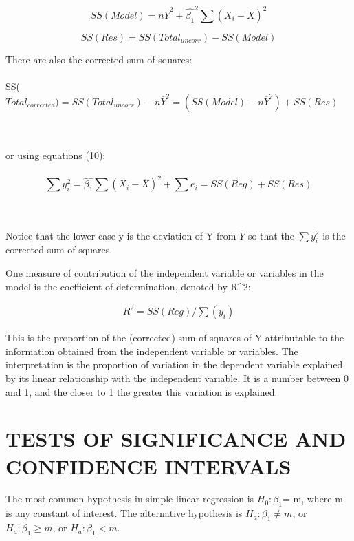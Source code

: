 \documentclass[letterpaper,11pt]{article}
\begin{document}
	\begin{equation}	
	SS(Model)= n \overline{Y}^2 + \hat{\beta_{1}}^2 \sum(X_{i} - \overline{X})^2
	\end{equation}
		
	\begin{equation}		
	SS(Res)= SS(Total_{uncorr})- SS(Model)
	\end{equation}	
	
	There are also the corrected sum of squares:
	\\ \\
	SS($Total_{corrected})= SS(Total_{uncorr}) - n \overline{Y}^2= ( SS(Model)- n \overline{Y}^2) + SS(Res)$ 
	
	\\ \\
	or using equations (10):
	\\ \\
	
		\begin{equation}
		\sum{y_{i}^2}= \hat{\beta_{1}} \sum (X_{i}- \overline{X})^2 + \sum{e_{i}} = SS(Reg) + SS(Res)
		\end{equation}
	
	\\ \\
	Notice that the lower case y is the deviation of Y from $\overline{Y}$ so that the $\sum y_{i}^2$ is the corrected sum of squares.
	
	One measure of contribution of the independent variable or variables in the model is the coefficient of determination, denoted by R^2:

	\begin{equation}	
	\begin{gathered}
	R^2= SS(Reg)/ \sum(y_{i})
	\end{gathered}
	\end{equation}
	
	This is the proportion of the (corrected) sum of squares of Y attributable to the information obtained from the independent variable or 
	variables. The interpretation is the proportion of variation in the dependent variable 
	explained by its linear relationship with the independent variable. It is a number between 0 and 1, and the closer to 1 the greater this 
	variation is explained. 

\section{TESTS OF SIGNIFICANCE AND CONFIDENCE INTERVALS}
	The most common hypothesis in simple linear regression is $H_{0}: \beta_{1}$= m, where m is any constant of interest.
	The alternative hypothesis is $H_{a}: \beta_{1} \neq m$, or $H_{a}: \beta_{1} \geq m$, or $H_{a}: \beta_{1} < m$.
	
\end{document}
